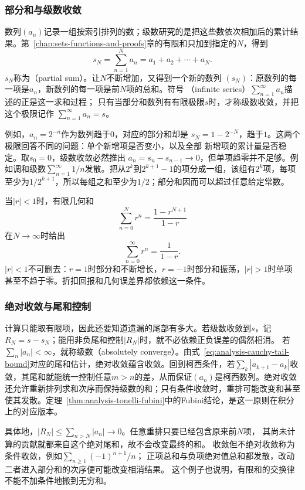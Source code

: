 \subsubsection{部分和与级数收敛}

数列$(a_n)$记录一组按索引排列的数；级数研究的是把这些数依次相加后的累计结果。第~\ref{chap:sets-functions-and-proofs}章的有限和只加到指定的$N$，得到
\[
  s_N=\sum_{n=1}^{N}a_n=a_1+a_2+\cdots+a_N.
\]
$s_N$称为（partial sum）。让$N$不断增加，又得到一个新的数列
$(s_N)$：原数列的每一项是$a_n$，新数列的每一项是前$N$项的总和。符号
（infinite series）$\sum_{n=1}^{\infty}a_n$描述的正是这一求和过程；
只有当部分和数列有有限极限$s$时，才称级数收敛，并把这个极限记作
$\sum_{n=1}^{\infty}a_n=s$。

例如，$a_n=2^{-n}$作为数列趋于$0$，对应的部分和却是
$s_N=1-2^{-N}$，趋于$1$。这两个极限回答不同的问题：单个新增项是否变小，以及全部
新增项的累计量是否稳定。取$s_0=0$，级数收敛必然推出
$a_n=s_n-s_{n-1}\to0$，但单项趋零并不足够。例如调和级数$\sum_{n=1}^{\infty}1/n$发散。把从$2^k$到$2^{k+1}-1$的项分成一组，该组有$2^k$项，每项至少为$1/2^{k+1}$，所以每组之和至少为$1/2$；部分和因而可以超过任意给定常数。

当$|r|<1$时，有限几何和
\[   \sum_{n=0}^{N}r^n=\frac{1-r^{N+1}}{1-r} \]
在$N\to\infty$时给出
\begin{equation}
  \sum_{n=0}^{\infty}r^n=\frac{1}{1-r}.
\label{eq:analysis-geometric-series}
\end{equation}
$|r|<1$不可删去：$r=1$时部分和不断增长，$r=-1$时部分和振荡，$|r|>1$时单项甚至不趋于零。折扣回报和几何误差界都依赖这一条件。

\subsubsection{绝对收敛与尾和控制}
计算只能取有限项，因此还要知道遗漏的尾部有多大。若级数收敛到$s$，记
$R_N=s-s_N$；能用非负尾和控制$|R_N|$时，就不必依赖正负误差的偶然相消。
若$\sum_n|a_n|<\infty$，就称级数（absolutely converge）。由式~\eqref{eq:analysis-cauchy-tail-bound}对应的尾和估计，绝对收敛蕴含收敛。回到柯西条件，若$\sum_k|a_{k+1}-a_k|$收敛，其尾和就能统一控制任意$m>n$的差，从而保证$(a_n)$是柯西数列。绝对收敛还允许重新排列求和次序而保持级数的和；只有条件收敛时，重排可能改变和甚至使其发散。定理~\ref{thm:analysis-tonelli-fubini}中的Fubini结论，是这一原则在积分上的对应版本。

具体地，$|R_N|\leq\sum_{n>N}|a_n|\to0$。任意重排只要已经包含原来前$N$项，
其尚未计算的贡献就都来自这个绝对尾和，故不会改变最终的和。
收敛但不绝对收敛称为条件收敛，例如$\sum_{n\geq1}(-1)^{n+1}/n$；
正项总和与负项绝对值总和都发散，改动二者进入部分和的次序便可能改变相消结果。
这个例子也说明，有限和的交换律不能不加条件地搬到无穷和。

